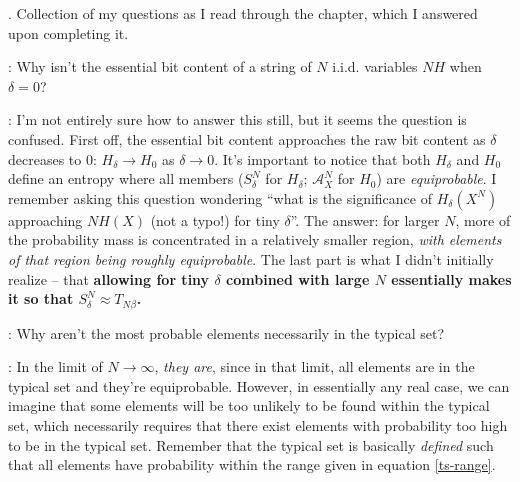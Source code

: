 \documentclass[11pt]{article}
\newcommand\myspace[1][]{\vspace{#1\bigskipamount}}
\newcommand\p{\Needspace{10\baselineskip} \noindent}
\newcommand\QA[2]{\item \red{Q}: #1
	\begin{compactitem}
		\item \green{A}: #2
	\end{compactitem}}
\begin{document}
\myspace
\p {Questions \& Answers}. Collection of my questions as I read through the chapter, which I answered upon completing it.
\begin{compactitem}
	\QA{Why isn't the essential bit content of a string of $N$ i.i.d. variables $NH$ when $\delta = 0$?}{I'm not entirely sure how to answer this still, but it seems the question is confused. First off, the essential bit content approaches the raw bit content as $\delta$ decreases to 0: $H_{\delta} \rightarrow H_0$ as $\delta \rightarrow 0$. It's important to notice that both $H_{\delta}$ and $H_0$ define an entropy where all members ($S_{\delta}^N$ for $H_{\delta}$; $\mathcal{A}_X^N$ for $H_0$) are \textit{equiprobable}. I remember asking this question wondering ``what is the significance of $H_{\delta}(X^N)$ approaching $NH(X)$ (not a typo!) for tiny $\delta$''. The answer: for larger $N$, more of the probability mass is concentrated in a relatively smaller region, \textit{with elements of that region being roughly equiprobable}. The last part is what I didn't initially realize -- that \textbf{allowing for tiny $\delta$ combined with large $N$ essentially makes it so that $S_{\delta}^N \approx T_{N\beta}$.}   }
	
	\QA{Why aren't the most probable elements necessarily in the typical set?}{In the limit of $N \rightarrow \infty$, \textit{they are}, since in that limit, all elements are in the typical set and they're equiprobable. However, in essentially any real case, we can imagine that some elements will be too unlikely to be found within the typical set, which necessarily requires that there exist elements with probability too high to be in the typical set. Remember that the typical set is basically \textit{defined} such that all elements have probability within the range given in equation \ref{ts-range}.}
\end{compactitem}








\end{document}
